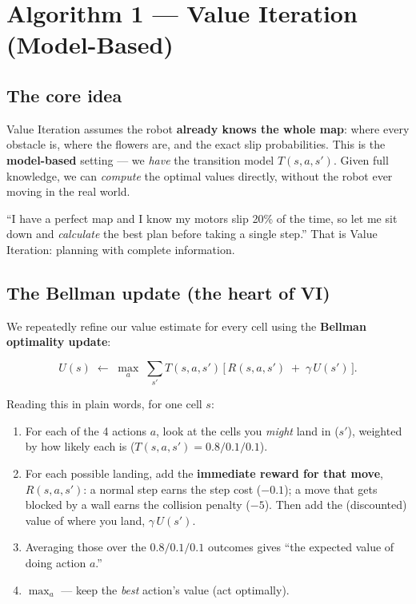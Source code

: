 \documentclass[11pt]{article}
\begin{document}
\section{Algorithm 1 --- Value Iteration (Model-Based)}

\subsection{The core idea}
Value Iteration assumes the robot \textbf{already knows the whole map}: where
every obstacle is, where the flowers are, and the exact slip probabilities. This
is the \textbf{model-based} setting --- we \emph{have} the transition model
$T(s,a,s')$. Given full knowledge, we can \emph{compute} the optimal values
directly, without the robot ever moving in the real world.

\begin{intuition}
``I have a perfect map and I know my motors slip 20\% of the time, so let me sit
down and \emph{calculate} the best plan before taking a single step.'' That is
Value Iteration: planning with complete information.
\end{intuition}

\subsection{The Bellman update (the heart of VI)}

We repeatedly refine our value estimate for every cell using the
\textbf{Bellman optimality update}:

\begin{equation}
U(s) \;\leftarrow\; \max_{a}\; \sum_{s'} T(s,a,s')\,\bigl[\,R(s,a,s') \;+\; \gamma\, U(s')\,\bigr].
\label{eq:bellman}
\end{equation}

Reading this in plain words, for one cell $s$:
\begin{enumerate}[nosep]
  \item For each of the 4 actions $a$, look at the cells you \emph{might} land in
        ($s'$), weighted by how likely each is ($T(s,a,s')=0.8/0.1/0.1$).
  \item For each possible landing, add the \textbf{immediate reward for that
        move}, $R(s,a,s')$: a normal step earns the step cost ($-0.1$); a move
        that gets blocked by a wall earns the collision penalty ($-5$). Then add
        the (discounted) value of where you land, $\gamma\,U(s')$.
  \item Averaging those over the $0.8/0.1/0.1$ outcomes gives ``the expected
        value of doing action $a$.''
  \item $\max_a$ --- keep the \emph{best} action's value (act optimally).
\end{enumerate}
\end{document}
